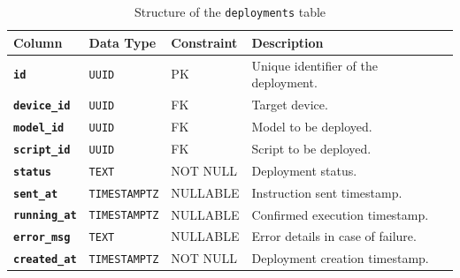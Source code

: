 \begin{table}[H]
    \centering
    \caption{Structure of the \texttt{deployments} table}
    \label{tab:deployments}
    \begin{tabular}{p{}
                    p{}
                    p{}
                    p{}}
        \hline
        \textbf{Column} & \textbf{Data Type} & \textbf{Constraint} & \textbf{Description} \\
        \hline
        \textbf{\texttt{id}} & \texttt{UUID} & \gls{PK} & Unique identifier of the deployment. \\
        \textbf{\texttt{device\_id}} & \texttt{UUID} & \gls{FK} & Target device. \\
        \textbf{\texttt{model\_id}} & \texttt{UUID} & \gls{FK} & Model to be deployed. \\
        \textbf{\texttt{script\_id}} & \texttt{UUID} & \gls{FK} & Script to be deployed. \\
        \textbf{\texttt{status}} & \texttt{TEXT} & NOT NULL & Deployment status. \\
        \textbf{\texttt{sent\_at}} & \texttt{TIMESTAMPTZ} & NULLABLE & Instruction sent timestamp. \\
        \textbf{\texttt{running\_at}} & \texttt{TIMESTAMPTZ} & NULLABLE & Confirmed execution timestamp. \\
        \textbf{\texttt{error\_msg}} & \texttt{TEXT} & NULLABLE & Error details in case of failure. \\
        \textbf{\texttt{created\_at}} & \texttt{TIMESTAMPTZ} & NOT NULL & Deployment creation timestamp. \\
        \hline
    \end{tabular}
\end{table}

